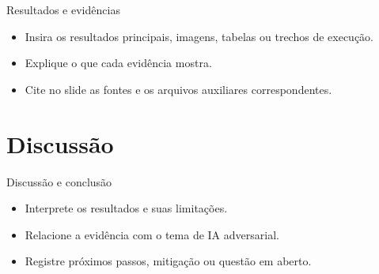 \begin{frame}{Resultados e evidências}
\begin{itemize}
  \item Insira os resultados principais, imagens, tabelas ou trechos de execução.
  \item Explique o que cada evidência mostra.
  \item Cite no slide as fontes e os arquivos auxiliares correspondentes.
\end{itemize}
\end{frame}

\section{Discussão}

\begin{frame}{Discussão e conclusão}
\begin{itemize}
  \item Interprete os resultados e suas limitações.
  \item Relacione a evidência com o tema de IA adversarial.
  \item Registre próximos passos, mitigação ou questão em aberto.
\end{itemize}
\end{frame}


\nocite{duarte26prompt}